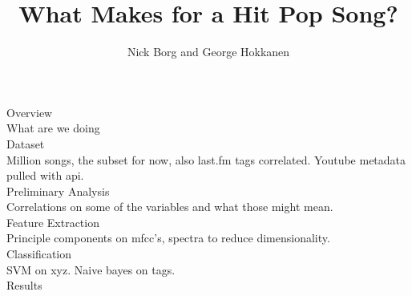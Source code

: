 \documentclass[11pt]{amsart}
\title{What Makes for a Hit Pop Song?}
\author{Nick Borg and George Hokkanen}
\begin{document}
\maketitle
{\huge Overview \huge} \\
What are we doing \\

{\huge Dataset \huge} \\
Million songs, the subset for now, also last.fm tags correlated. Youtube metadata pulled with api.\\

{\huge Preliminary Analysis \huge} \\
Correlations on some of the variables and what those might mean.\\

{\huge Feature Extraction \huge} \\
Principle components on mfcc's, spectra to reduce dimensionality.\\

{\huge Classification \huge} \\
SVM on xyz. Naive bayes on tags.\\

{\huge Results \huge} \\
\end{document}
